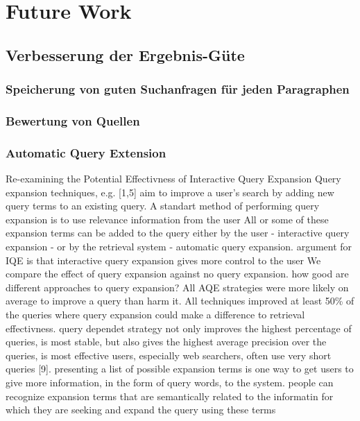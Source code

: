 \section{Future Work}
\label{sec:futureWork}
 \subsection{Verbesserung der Ergebnis-Güte}

  \subsubsection{Speicherung von guten Suchanfragen für jeden Paragraphen}
  \subsubsection{Bewertung von Quellen}

  \subsubsection{Automatic Query Extension}
		Re-examining the Potential Effectivness of Interactive Query Expansion
  Query expansion techniques, e.g. [1,5] aim to improve a user's search by adding new query terms to an existing query. A standart method of performing query expansion is to use relevance information from the user
  All or some of these expansion terms can be added to the query either by the user - interactive query expansion - or by the retrieval system - automatic query expansion.
  argument for IQE is that interactive query expansion gives more control to the user
  We compare the effect of query expansion against no query expansion. how good are different approaches to query expansion? 
  All AQE strategies were more likely on average to improve a query than harm it. All techniques improved at least 50\% of the queries where query expansion could make a difference to retrieval effectivness.
  query dependet strategy not only improves the highest percentage of queries, is most stable, but also gives the highest average precision over the queries, is most effective
  users, especially web searchers, often use very short queries [9]. presenting a list of possible expansion terms is one way to get users to give more information, in the form of query words, to the system.
  people can recognize expansion terms that are semantically related to the informatin for which they are seeking and expand the query using these terms


